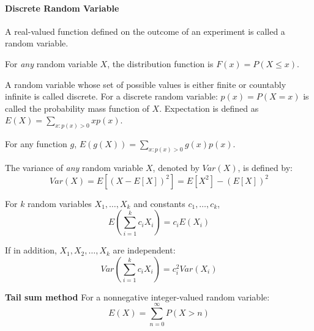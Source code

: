 \documentclass[10pt,twocolumn]{article}
\numberwithin{equation}{section}
\begin{document}
\paragraph{Discrete Random Variable}
\ben
\item A real-valued function defined on the outcome of an experiment is called a random variable. 
\item For \textit{any} random variable $X$, the distribution function is $F(x) = P(X \le x)$. 
\item A random variable whose set of possible values is either finite or countably infinite
is called discrete. For a discrete random variable: $p(x) = P(X = x)$ is called the probability mass function of $X$. Expectation is defined as $E(X) = \sum_{x: p(x) > 0} x p(x)$. 
\item For any function $g$, $E(g(X)) = \sum_{x: p(x) > 0} g(x) p(x)$. 
\item The variance of \textit{any} random variable $X$, denoted by $Var(X)$, is defined by: 
\[
Var(X) = E[(X - E[X])^2] = E[X^2] - (E[X])^2 
\]
\item For $k$ random variables $X_1, \ldots, X_k$ and constants $c_1, \ldots, c_k$,
\[
E(\sum_{i=1}^{k} c_i X_i) = c_i E(X_i)
\]
\item If in addition, $X_1, X_2, \ldots, X_k$ are independent: 
\[
Var(\sum_{i=1}^{k} c_i X_i) = c_i^2 Var(X_i)
\]
\item \textbf{Tail sum method} For a nonnegative integer-valued random variable: 
\[
E(X) = \sum_{n=0}^{\infty} P(X >n)
\]
\een
\end{document}
